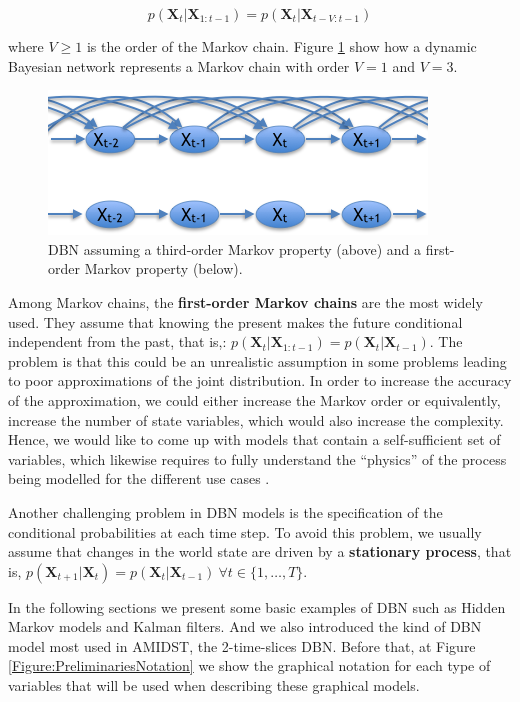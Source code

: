$$p(\bm X_t| \bm X_{1:t-1})  = p(\bm X_t|\bm X_{t-V:t-1})$$

\noindent where $V\geq 1$ is the order of the Markov chain.   Figure \ref{Figure:markovChain} show how a dynamic Bayesian network represents a Markov chain with order $V=1$ and $V=3$. 

\begin{figure}
\begin{center}
\includegraphics[scale=0.56]{./figures/PreliminariesMarkovChain}
\caption{\label{Figure:markovChain}DBN assuming a third-order Markov property (above) and a first-order Markov property (below).
}
\end{center}
\end{figure}


Among Markov chains, the \textbf{first-order Markov chains} are the most widely used. They assume that knowing the present makes the future conditional independent from the past, that is,: $p(\bm X_t| \bm X_{1:t-1})  = p(\bm X_t|\bm X_{t-1})$. The problem is that this could be an unrealistic assumption in some problems leading to poor approximations of the joint distribution. In order to increase the accuracy of the approximation, we could either increase the Markov order or equivalently, increase the number of state variables, which would also increase the complexity. Hence, we would like to come up with models that contain a self-sufficient set of variables, which likewise requires to fully understand the ``physics''  of the process being modelled for the different use cases \cite{russelNorvig2009}. 

Another challenging problem in  DBN models is the specification of the conditional probabilities at each time step. To avoid this problem, we usually assume that changes in the world state are driven by a \textbf{stationary process}, that is, $p(\bm X_{t+1}|\bm X_{t}) = p(\bm X_t|\bm X_{t-1})\ \forall t \in\{1,\ldots,T\}$. 

In the following sections we present some basic examples of DBN such as Hidden Markov models and Kalman filters. And we also introduced the kind of DBN model most used in AMIDST, the 2-time-slices DBN. Before that, at Figure \ref{Figure:PreliminariesNotation} we show the graphical notation for each type of variables that will be used when describing these graphical models. 

